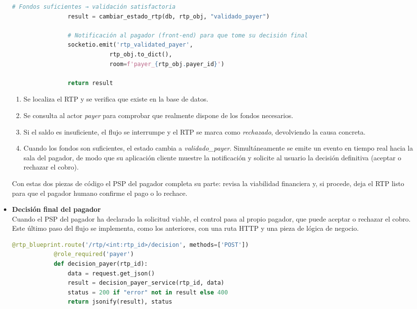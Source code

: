\begin{itemize}
\begin{lstlisting}[language=Python, style=custom]
                # Fondos suficientes → validación satisfactoria
                result = cambiar_estado_rtp(db, rtp_obj, "validado_payer")

                # Notificación al pagador (front-end) para que tome su decisión final
                socketio.emit('rtp_validated_payer',
                            rtp_obj.to_dict(),
                            room=f'payer_{rtp_obj.payer_id}')

                return result
        \end{lstlisting}

        \begin{enumerate}
          \item Se localiza el RTP y se verifica que existe en la base de
                datos.
          \item Se consulta al actor \emph{payer} para comprobar que realmente
                dispone de los fondos necesarios.
          \item Si el saldo es insuficiente, el flujo se interrumpe y el RTP se
                marca como \emph{rechazado}, devolviendo la causa concreta.
          \item Cuando los fondos son suficientes, el estado cambia a
                \emph{validado\_payer}.  Simultáneamente se emite un evento en
                tiempo real hacia la sala del pagador, de modo que su
                aplicación cliente muestre la notificación y solicite al
                usuario la decisión definitiva (aceptar o rechazar el cobro).
        \end{enumerate}
        \bigskip

        Con estas dos piezas de código el PSP del pagador completa su parte:
        revisa la viabilidad financiera y, si procede, deja el RTP listo para
        que el pagador humano confirme el pago o lo rechace.

          \item \textbf{Decisión final del pagador}\\[6pt]
        Cuando el PSP del pagador ha declarado la solicitud viable, el
        control pasa al propio pagador, que puede aceptar o rechazar el
        cobro.  Este último paso del flujo se implementa, como los
        anteriores, con una ruta HTTP y una pieza de lógica de negocio.
        \vspace{0.6em}

       \begin{lstlisting}[language=Python, style=custom]
            @rtp_blueprint.route('/rtp/<int:rtp_id>/decision', methods=['POST'])
            @role_required('payer')
            def decision_payer(rtp_id):
                data = request.get_json()
                result = decision_payer_service(rtp_id, data)
                status = 200 if "error" not in result else 400
                return jsonify(result), status
        \end{lstlisting}


\end{itemize}
